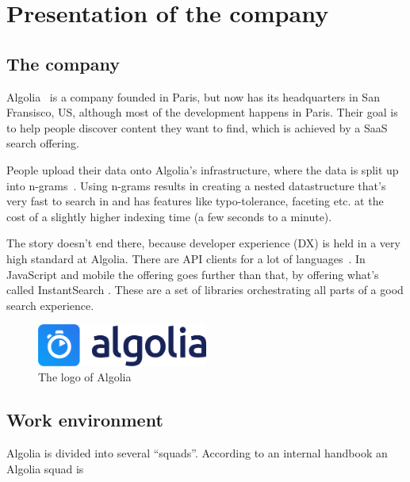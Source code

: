 
\chapter{Presentation of the company} %
\label{chp:presentation}

\section{The company} %
\label{sec:company}

Algolia~\cite{algolia-home} is a company founded in Paris, but now has its headquarters in San Fransisco, US, although most of the development happens in Paris. Their goal is to help people discover content they want to find, which is achieved by a SaaS search offering.

People upload their data onto Algolia’s infrastructure, where the data is split up into n-grams~\cite{kimbrell1988searching}. Using n-grams results in creating a nested datastructure that’s very fast to search in and has features like typo-tolerance, faceting etc. at the cost of a slightly higher indexing time (a few seconds to a minute).\cite{paris-nlp-algolia}

The story doesn’t end there, because developer experience (DX) is held in a very high standard at Algolia. There are API clients for a lot of languages~\cite{doc-api-clients}. In JavaScript and mobile the offering goes further than that, by offering what’s called InstantSearch \cite{instantsearch-js, react-instantsearch, instantsearch-android, instantsearch-ios}. These are a set of libraries orchestrating all parts of a good search experience.

\begin{figure}[H]
\label{figure:company-logo}
  \centering
  \includegraphics[width=0.5\textwidth]{../assets/algolia-logo-light.pdf}
  \caption{The logo of Algolia \cite{algolia-press}}
\end{figure}

\section{Work environment}
\label{sec:work-environment}

Algolia is divided into several ``squads''. According to an internal handbook an Algolia squad is

